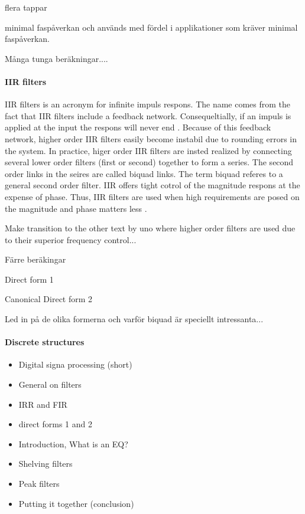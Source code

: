 \documentclass[12p]{article}
\begin{document}
flera tappar

minimal faspåverkan och används med fördel i applikationer som kräver minimal faspåverkan.

Många tunga beräkningar....


\paragraph{IIR filters}
IIR filters is an acronym for infinite impuls respons. The name comes from the fact that IIR filters include a feedback network. Consequeltially, if an impuls is applied at the input the respons will never end \cite{sven}. Because of this feedback network, higher order IIR filters easily become instabil due to rounding errors in the system. In practice, higer order IIR filters are insted realized by connecting several lower order filters (first or second) together to form a series. The second order links in the seires are called biquad links. The term biquad referes to a general second order filter. IIR offers tight cotrol of the magnitude respons at the expense of phase. Thus, IIR filters are used when high requirements are posed on the magnitude and phase matters less \cite{storn}.

Make transition to the other text by uno where higher order filters are used due to their superior frequency control...



Färre beräkingar

Direct form 1

Canonical Direct form 2

Led in på de olika formerna och varför biquad är speciellt intressanta...



\paragraph{Discrete structures}












\begin{itemize}
\item Digital signa processing (short)
\item General on filters
\item IRR and FIR
\item direct forms 1 and 2
\item Introduction, What is an EQ?
\item Shelving filters
\item Peak filters
\item Putting it together (conclusion)
\end{itemize}
\end{document}
